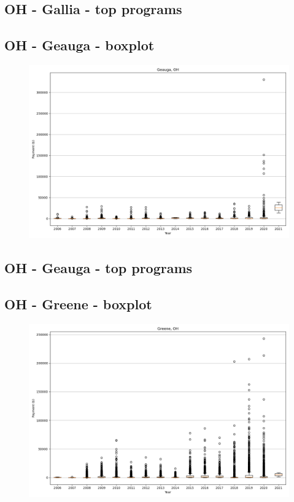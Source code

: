 \subsection*{OH - Gallia - top programs}

\newpage
\subsection*{OH - Geauga - boxplot}
\begin{figure}[h]
\centering
\includegraphics[width=7in]{../output/boxplots/counties/Geauga-OH_boxplot.png}
\end{figure}


\subsection*{OH - Geauga - top programs}

\newpage
\subsection*{OH - Greene - boxplot}
\begin{figure}[h]
\centering
\includegraphics[width=7in]{../output/boxplots/counties/Greene-OH_boxplot.png}
\end{figure}



